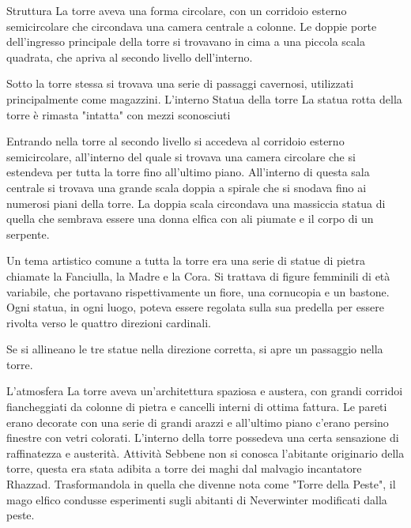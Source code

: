 \documentclass{article}
\begin{document}
Struttura\newline
La torre aveva una forma circolare, con un corridoio esterno semicircolare che circondava una camera centrale a colonne. Le doppie porte dell'ingresso principale della torre si trovavano in cima a una piccola scala quadrata, che apriva al secondo livello dell'interno.

Sotto la torre stessa si trovava una serie di passaggi cavernosi, utilizzati principalmente come magazzini.\newline
L'interno\newline
Statua della torre
La statua rotta della torre è rimasta "intatta" con mezzi sconosciuti

Entrando nella torre al secondo livello si accedeva al corridoio esterno semicircolare, all'interno del quale si trovava una camera circolare che si estendeva per tutta la torre fino all'ultimo piano. All'interno di questa sala centrale si trovava una grande scala doppia a spirale che si snodava fino ai numerosi piani della torre. La doppia scala circondava una massiccia statua di quella che sembrava essere una donna elfica con ali piumate e il corpo di un serpente.

Un tema artistico comune a tutta la torre era una serie di statue di pietra chiamate la Fanciulla, la Madre e la Cora. Si trattava di figure femminili di età variabile, che portavano rispettivamente un fiore, una cornucopia e un bastone. Ogni statua, in ogni luogo, poteva essere regolata sulla sua predella per essere rivolta verso le quattro direzioni cardinali.

Se si allineano le tre statue nella direzione corretta, si apre un passaggio nella torre.

L'atmosfera\newline
La torre aveva un'architettura spaziosa e austera, con grandi corridoi fiancheggiati da colonne di pietra e cancelli interni di ottima fattura. Le pareti erano decorate con una serie di grandi arazzi e all'ultimo piano c'erano persino finestre con vetri colorati. L'interno della torre possedeva una certa sensazione di raffinatezza e austerità.\newline
Attività\newline
Sebbene non si conosca l'abitante originario della torre, questa era stata adibita a torre dei maghi dal malvagio incantatore Rhazzad. Trasformandola in quella che divenne nota come "Torre della Peste", il mago elfico condusse esperimenti sugli abitanti di Neverwinter modificati dalla peste.
\end{document}
